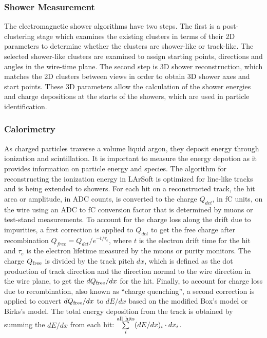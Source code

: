 \subsubsection{Shower Measurement}


The electromagnetic shower algorithms have two
steps. The first is a post-clustering stage which examines the
existing clusters in terms of their 2D parameters to determine whether
the clusters are shower-like or track-like. 
The selected shower-like clusters are examined to assign starting points,
directions and angles in the wire-time plane. The second step is 
3D shower reconstruction, which
matches the 2D clusters between views in order to obtain 3D shower axes and start points.
These 3D parameters allow the calculation of the shower energies and charge
depositions at the starts of the showers, which are used in particle
identification. 

\subsubsection{Calorimetry}


As charged particles traverse a volume liquid argon, they deposit
energy through ionization and scintillation. It is important to
measure the energy depotion as it provides information on particle
energy and species. The algorithm for reconstructing the ionization
energy in LArSoft is optimized for line-like tracks and is being
extended to showers. 
For each hit on a reconstructed track, the hit area or amplitude, in ADC counts, is
converted to the charge $Q_{det}$, in fC units, on the wire using an
ADC to fC conversion factor that is determined by muons or test-stand
measurements. To account for the charge loss along the drift due to
impurities, a first correction is applied to $Q_{det}$ to get the free
charge after recombination $Q_{free} = Q_{det}/e^{-t/\tau_{e}}$, where
$t$ is the electron drift time for the hit and $\tau_{e}$ is the
electron lifetime measured by the muons or purity monitors. The charge
$Q_{\rm{free}}$ is divided by the track pitch $dx$, which is defined as the
dot production of track direction and the direction normal to the wire
direction in the wire plane, to get the $dQ_{\rm{free}}/dx$ for the
hit. Finally, to account for charge loss due to recombination, also
known as ``charge quenching'', a second correction is applied to
convert $dQ_{\rm{free}}/dx$ to $dE/dx$ based on the modified Box's model
\cite{box} or Birks's model\cite{birks}. The total energy
deposition from the track is obtained by summing the $dE/dx$ from each
hit: $\sum\limits_{i}^{\rm{all\ hits}}(dE/dx)_{i}\cdot dx_{i}$.


